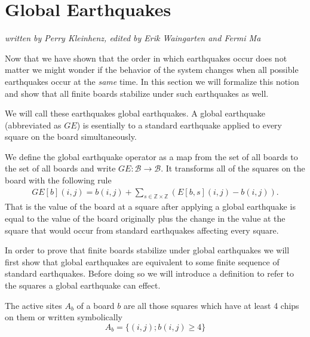 \documentclass[runningheads,a4paper]{llncs}
\begin{document}
\section{Global Earthquakes}
\label{Global Earthquakes}
\emph{written by Perry Kleinhenz, edited by Erik Waingarten and Fermi Ma}

Now that we have shown that the order in which earthquakes occur does not matter we might wonder if the behavior of the system changes when all possible earthquakes occur at the \emph{same} time. In this section we will formalize this notion and show that all finite boards stabilize under such earthquakes as well.

We will call these earthquakes global earthquakes. A global earthquake (abbreviated as $GE$) is esentially to a standard earthquake applied to every square on the board simultaneously.
\begin{definition} We define the global earthquake operator as a map from the set of all boards to the set of all boards and write $GE: \mathcal{B} \rightarrow \mathcal{B}$. 
It transforms all of the squares on the board with the following rule
\begin{align*}
GE[b](i,j) = b(i,j) +\sum_{s \in \mathbb{Z} \times \mathbb{Z}} (E[b, s](i,j) - b(i,j)).
\end{align*}
That is the value of the board at a square after applying a global earthquake is equal to the value of the board originally plus the change in the value at the square that would occur from standard earthquakes affecting every square.  
\end{definition}

In order to prove that finite boards stabilize under global earthquakes we will first show that global earthquakes are equivalent to some finite sequence of standard earthquakes. Before doing so we will introduce a definition to refer to the squares a global earthquake can effect.

\begin{definition} The active sites $A_b$ of a board $b$ are all those squares which have at least 4 chips on them or written symbolically
\begin{equation*}
A_b=\{ (i,j); b(i,j) \geq 4 \}
\end{equation*}
\end{definition}
\end{document}
